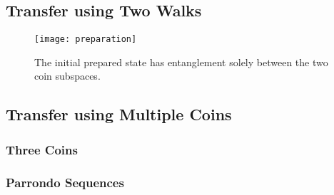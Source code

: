 \subsection{Transfer using Two Walks}
\lipsum[1]
\begin{figure}
    \centering
    \texttt{[image: preparation]}
    \caption{The initial prepared state has entanglement solely between the two coin subspaces.}
\end{figure}
\subsection{Transfer using Multiple Coins}
\subsubsection{Three Coins}
\lipsum[1]
\subsubsection{Parrondo Sequences}
\lipsum[1]